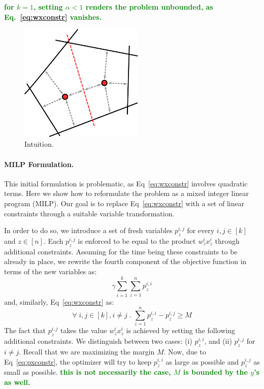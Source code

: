 \documentclass{article}
\renewcommand\[{\begin{equation}}
\renewcommand\]{\end{equation}}
\newcommand{\stefano}[1]{{\bf \textcolor{green}{{\fbox{Stefano:} #1}}}}
\begin{document}
\stefano{for $k=1$, setting $\alpha < 1$  renders the problem unbounded, as
Eq.~\ref{eq:wxconstr} vanishes.}

\begin{figure}[t]
    \begin{center}
        \includegraphics[width=16em]{setmargin}
    \end{center}
    \caption{\label{fig:setmargin} Intuition.}
\end{figure}

\paragraph{MILP Formulation.} This initial formulation is problematic, as
Eq~\ref{eq:wxconstr} involves quadratic terms. Here we show how to reformulate
the problem as a mixed integer linear program (MILP). Our goal is to replace
Eq~\ref{eq:wxconstr} with a set of linear constraints through a suitable
variable transformation.

In order to do so, we introduce a set of fresh variables $p^{i,j}_z$ for every
$i,j\in[k]$ and $z\in[n]$. Each $p^{i,j}_z$ is enforced to be equal to the
product $w^{i}_z x^{i}_z$ through additional constraints. Assuming for the
time being these constraints to be already in place, we rewrite the fourth
component of the objective function in terms of the new variables as:
%
$$ \gamma \sum_{i=1}^k \sum_{z=1}^n p^{i,i}_z $$
%
and, similarly, Eq~\ref{eq:wxconstr} as:
%
\[ \forall \; i, j \in [k], i \neq j \;.\; \sum_{z=1}^n p^{i,i}_z - p^{i,j}_z \ge M \label{eq:pxconstr} \]
%
The fact that $p^{i,j}_z$ takes the value $w^{i}_z x^{i}_z$ is achieved by
setting the following additional constraints. We distinguish between two cases:
(i) $p^{i,i}_z$, and (ii) $p^{i,j}_z$ for $i \ne j$.  Recall that we are
maximizing the margin $M$. Now, due to Eq~\ref{eq:pxconstr}, the optimizer will
try to keep $p^{i,i}_z$ as large as possible and $p^{i,j}_z$ as small as
possible. \stefano{this is not necessarily the case, $M$ is bounded by the
$y$'s as well.}
\end{document}
